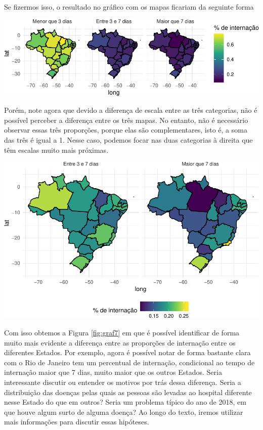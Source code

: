 \documentclass[]{book}
\begin{document}
Se fizermos isso, o resultado no gráfico com os mapas ficariam da seguinte forma

\begin{center}\includegraphics[width=0.8\linewidth]{notas_livro_files/figure-latex/graf6-1} \end{center}

Porém, note agora que devido a diferença de escala entre as três categorias, não é possível perceber a diferença entre os três mapas. No entanto, não é necessário observar essas três proporções, porque elas são complementares, isto é, a soma das três é igual a 1. Nesse caso, podemos focar nas duas categorias à direita que têm escalas muito mais próximas.

\begin{center}\includegraphics[width=0.8\linewidth]{notas_livro_files/figure-latex/graf7-1} \end{center}

Com isso obtemos a Figura \ref{fig:graf7} em que é possível identificar de forma muito mais evidente a diferença entre as proporções de internação entre os diferentes Estados. Por exemplo, agora é possível notar de forma bastante clara com o Rio de Janeiro tem um percentual de internação, condicional ao tempo de internação maior que 7 dias, muito maior que os outros Estados. Seria interessante discutir ou entender os motivos por trás dessa diferença. Seria a distribuição das doenças pelas quais as pessoas são levadas ao hospital diferente nesse Estado do que em outros? Seria um problema típico do ano de 2018, em que houve algum surto de alguma doença? Ao longo do texto, iremos utilizar mais informações para discutir essas hipóteses.
\end{document}
